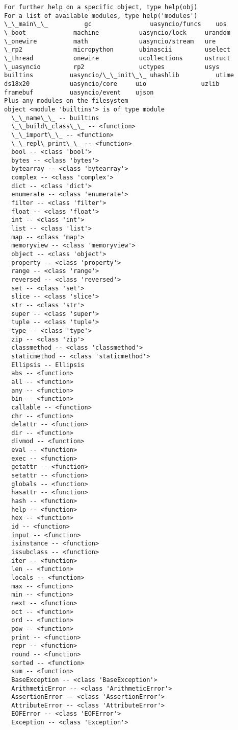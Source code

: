 \documentclass[11pt]{article}
\begin{document}
\begin{Verbatim}[commandchars=\\\{\}]
For further help on a specific object, type help(obj)
For a list of available modules, type help('modules')
\_\_main\_\_          gc                uasyncio/funcs    uos
\_boot             machine           uasyncio/lock     urandom
\_onewire          math              uasyncio/stream   ure
\_rp2              micropython       ubinascii         uselect
\_thread           onewire           ucollections      ustruct
\_uasyncio         rp2               uctypes           usys
builtins          uasyncio/\_\_init\_\_ uhashlib          utime
ds18x20           uasyncio/core     uio               uzlib
framebuf          uasyncio/event    ujson
Plus any modules on the filesystem
object <module 'builtins'> is of type module
  \_\_name\_\_ -- builtins
  \_\_build\_class\_\_ -- <function>
  \_\_import\_\_ -- <function>
  \_\_repl\_print\_\_ -- <function>
  bool -- <class 'bool'>
  bytes -- <class 'bytes'>
  bytearray -- <class 'bytearray'>
  complex -- <class 'complex'>
  dict -- <class 'dict'>
  enumerate -- <class 'enumerate'>
  filter -- <class 'filter'>
  float -- <class 'float'>
  int -- <class 'int'>
  list -- <class 'list'>
  map -- <class 'map'>
  memoryview -- <class 'memoryview'>
  object -- <class 'object'>
  property -- <class 'property'>
  range -- <class 'range'>
  reversed -- <class 'reversed'>
  set -- <class 'set'>
  slice -- <class 'slice'>
  str -- <class 'str'>
  super -- <class 'super'>
  tuple -- <class 'tuple'>
  type -- <class 'type'>
  zip -- <class 'zip'>
  classmethod -- <class 'classmethod'>
  staticmethod -- <class 'staticmethod'>
  Ellipsis -- Ellipsis
  abs -- <function>
  all -- <function>
  any -- <function>
  bin -- <function>
  callable -- <function>
  chr -- <function>
  delattr -- <function>
  dir -- <function>
  divmod -- <function>
  eval -- <function>
  exec -- <function>
  getattr -- <function>
  setattr -- <function>
  globals -- <function>
  hasattr -- <function>
  hash -- <function>
  help -- <function>
  hex -- <function>
  id -- <function>
  input -- <function>
  isinstance -- <function>
  issubclass -- <function>
  iter -- <function>
  len -- <function>
  locals -- <function>
  max -- <function>
  min -- <function>
  next -- <function>
  oct -- <function>
  ord -- <function>
  pow -- <function>
  print -- <function>
  repr -- <function>
  round -- <function>
  sorted -- <function>
  sum -- <function>
  BaseException -- <class 'BaseException'>
  ArithmeticError -- <class 'ArithmeticError'>
  AssertionError -- <class 'AssertionError'>
  AttributeError -- <class 'AttributeError'>
  EOFError -- <class 'EOFError'>
  Exception -- <class 'Exception'>

\end{Verbatim}
\end{document}
